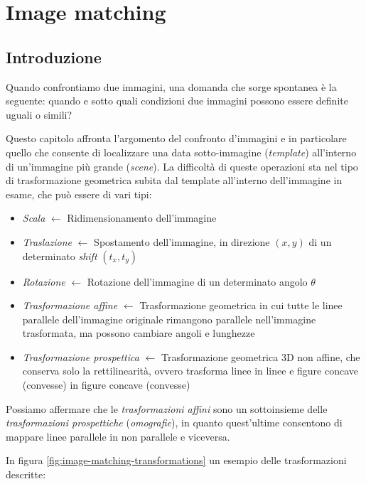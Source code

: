 \chapter{Image matching}
\label{chap:image-matching}


\section{Introduzione}
\label{sec:image-matching-intro}
Quando confrontiamo due immagini, una domanda che sorge spontanea \`e la seguente: quando e sotto quali condizioni due immagini possono essere definite uguali o simili?\par
Questo capitolo affronta l'argomento del confronto d'immagini e in particolare quello che consente di localizzare una data sotto-immagine (\textit{template}) all'interno di un'immagine pi\`u grande (\textit{scene}). La difficolt\`a di queste operazioni sta nel tipo di trasformazione geometrica subita dal template all'interno dell'immagine in esame, che pu\`o essere di vari tipi:
\begin{itemize}
	\item \textit{Scala} $\gets$ Ridimensionamento dell'immagine
	\item \textit{Traslazione} $\gets$ Spostamento dell'immagine, in direzione $(x, y)$ di un determinato \textit{shift} $(t_{x}, t_{y})$
	\item \textit{Rotazione} $\gets$ Rotazione dell'immagine di un determinato angolo $\theta$
	\item \textit{Trasformazione affine} $\gets$ Trasformazione geometrica in cui tutte le linee parallele dell'immagine originale rimangono parallele nell'immagine trasformata, ma possono cambiare angoli e lunghezze
	\item \textit{Trasformazione prospettica} $\gets$ Trasformazione geometrica 3D non affine, che conserva solo la rettilinearit\`a, ovvero trasforma linee in linee e figure concave (convesse) in figure concave (convesse)
\end{itemize}
Possiamo affermare che le \textit{trasformazioni affini} sono un sottoinsieme delle \textit{trasformazioni prospettiche} (\textit{omografie}), in quanto quest'ultime consentono di mappare linee parallele in non parallele e viceversa.\par
In figura \ref{fig:image-matching-transformations} un esempio delle trasformazioni descritte:
\pgfplotsset{compat=1.9}
